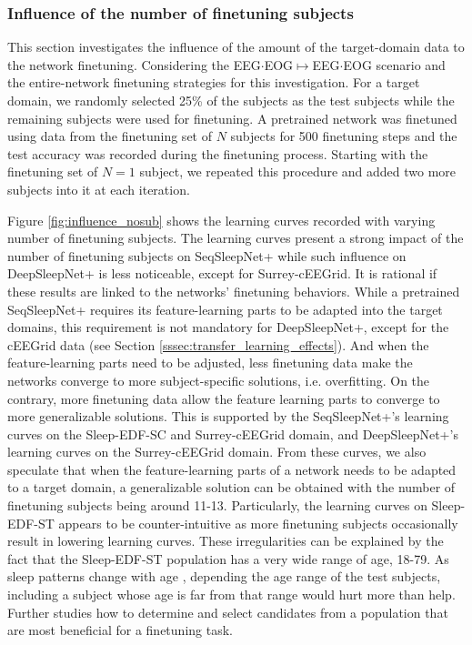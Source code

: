 \documentclass[journal,twoside,web]{ieeecolor}
\begin{document}
\subsubsection{Influence of the number of finetuning subjects}

This section investigates the influence of the amount of the target-domain data to the network finetuning. Considering the EEG$\cdot$EOG$\mapsto$EEG$\cdot$EOG scenario and the entire-network finetuning strategies for this investigation. For a target domain, we randomly selected 25\% of the subjects as the test subjects while the remaining subjects were used for finetuning. A pretrained network was finetuned using data from the finetuning set of $N$ subjects for 500 finetuning steps and the test accuracy was recorded during the finetuning process. Starting with the finetuning set of $N=1$ subject, we repeated this procedure and added two more subjects into it at each iteration.

Figure \ref{fig:influence_nosub}  shows the learning curves recorded with varying number of finetuning subjects. The learning curves present a strong impact of the number of finetuning subjects on SeqSleepNet+ while such influence on DeepSleepNet+ is less noticeable, except for Surrey-cEEGrid. It is rational if these results are linked to the networks' finetuning behaviors. While a pretrained SeqSleepNet+ requires its feature-learning parts to be adapted into the target domains, this requirement is not mandatory for DeepSleepNet+, except for the cEEGrid data (see Section \ref{sssec:transfer_learning_effects}). And when the feature-learning parts need to be adjusted, less finetuning data make the networks converge to more subject-specific solutions, i.e. overfitting. On the contrary, more finetuning data allow the feature learning parts to converge to more generalizable solutions. This is supported by the SeqSleepNet+'s learning curves on the Sleep-EDF-SC and Surrey-cEEGrid domain, and DeepSleepNet+'s learning curves on the Surrey-cEEGrid domain. From these curves, we also speculate that when the feature-learning parts of a network needs to be adapted to a target domain, a generalizable solution can be obtained with the number of finetuning subjects being around 11-13. Particularly, the learning curves on Sleep-EDF-ST appears to be counter-intuitive as more finetuning subjects occasionally result in lowering learning curves. These irregularities can be explained by the fact that the Sleep-EDF-ST population has a very wide range of age, 18-79. As sleep patterns change with age \cite{Skeldon2016}, depending the age range of the test subjects, including a subject whose age is far from that range would hurt more than help. Further studies how to determine and select candidates from a population that are most beneficial for a finetuning task.
\end{document}
